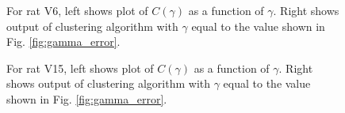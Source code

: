 \documentclass[superscriptaddress, twocolumn, prl]{revtex4}
\begin{document}
\begin{figure}
\centering
{}
\caption{For rat V6, left shows plot of $C\left(\gamma \right)$ as a function of $\gamma$. Right shows output of clustering algorithm with $\gamma$ equal to the value shown in Fig. \ref{fig:gamma_error}.}
\end{figure}

\begin{figure}
\centering
{}
\caption{For rat V15, left shows plot of $C\left(\gamma \right)$ as a function of $\gamma$. Right shows output of clustering algorithm with $\gamma$ equal to the value shown in Fig. \ref{fig:gamma_error}.}
\end{figure}
\end{document}
